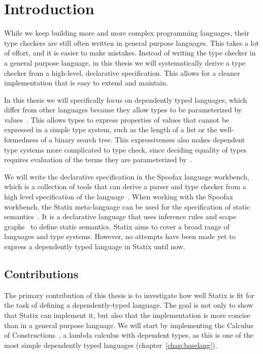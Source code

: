 \chapter{Introduction}

While we keep building more and more complex programming languages, their type checkers are still often written in general purpose languages. This takes a lot of effort, and it is easier to make mistakes. Instead of writing the type checker in a general purpose language, in this thesis we will systematically derive a type checker from a high-level, declarative specification. This allows for a cleaner implementation that is easy to extend and maintain. 

In this thesis we will specifically focus on dependently typed languages, which differ from other languages because they allow types to be parameterized by values~\cite{lambda_cube}. This allows types to express properties of values that cannot be expressed in a simple type system, such as the length of a list or the well-formedness of a binary search tree. This expressiveness also makes dependent type systems more complicated to type check, since deciding equality of types requires evaluation of the terms they are parameterized by~\cite{Coquand_Huet_1988}. 

We will write the declarative specification in the Spoofax language workbench, which is a collection of tools that can derive a parser and type checker from a high level specification of the language~\cite{spoofax}. When working with the Spoofax workbench, the Statix meta-language can be used for the specification of static semantics~\cite{scopes_as_types}. It is a declarative language that uses inference rules and scope graphs~\cite{scope_graphs} to define static semantics. Statix aims to cover a broad range of languages and type systems. However, no attempts have been made yet to express a dependently typed language in Statix until now.
 

\section*{Contributions}
The primary contribution of this thesis is to investigate how well Statix is fit for the task of defining a dependently-typed language. The goal is not only to show that Statix can implement it, but also that the implementation is more concise than in a general purpose language. We will start by implementing the Calculus of Constructions~\cite{Coquand_Huet_1988}, a lambda calculus with dependent types, as this is one of the most simple dependently typed languages (chapter~\ref{chap:baselang}). 

